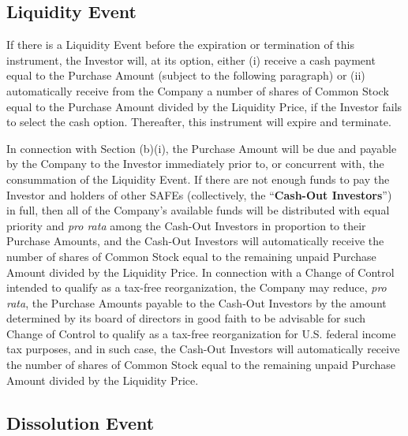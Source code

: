 \subsection{Liquidity Event}
\label{sec:liquidityevent}

If there is a Liquidity Event before the expiration or termination of
this instrument, the Investor will, at its option,
either (i) receive a cash payment
equal to the Purchase Amount (subject to the following paragraph)
or (ii) automatically receive from the Company a number of
shares of Common Stock equal to the Purchase Amount divided by the
Liquidity Price, if the Investor fails to select the cash
option. Thereafter, this instrument will expire and
terminate.

\begin{sloppypar}
In connection with Section (b)(i), the Purchase Amount will be due and
payable by the Company to the Investor immediately prior to, or
concurrent with, the consummation of the Liquidity Event. If there are
not enough funds to pay the Investor and holders of other SAFEs
(collectively, the “\textbf{Cash-Out Investors}”) in full, then all of
the Company’s available funds will be distributed with equal priority and
\emph{pro rata} among the Cash-Out Investors in proportion to their
Purchase Amounts, and the Cash-Out Investors will automatically receive the
number of shares of Common Stock equal to the remaining unpaid
Purchase Amount divided by the Liquidity Price.  In connection with a
Change of Control intended to qualify as a tax-free reorganization,
the Company may reduce, \emph{pro rata}, the Purchase Amounts payable
to the Cash-Out Investors by the amount determined by its board of directors
in good faith to be advisable for such Change of Control to qualify as
a tax-free reorganization for U.S. federal income tax purposes, and in
such case, the Cash-Out Investors will automatically receive the
number of shares of Common Stock equal to the remaining unpaid
Purchase Amount divided by the Liquidity Price.
\end{sloppypar}

\subsection{Dissolution Event}
\label{sec:dissolutionevent}

